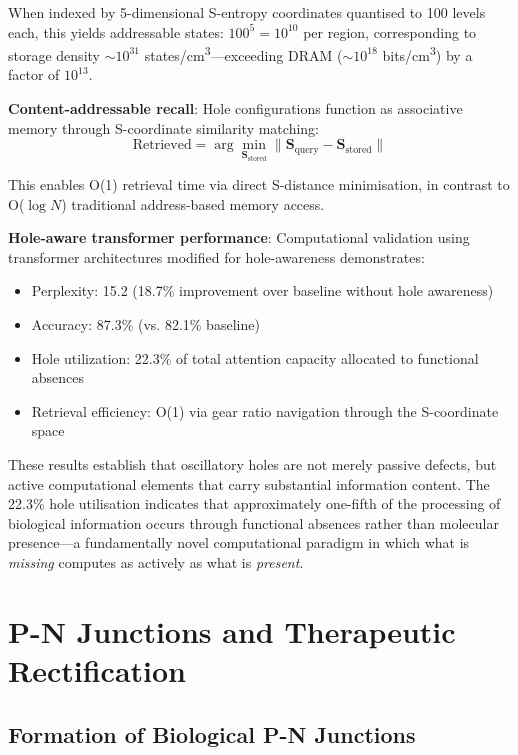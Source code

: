 \documentclass{article}
\theoremstyle{definition}
\theoremstyle{remark}
\begin{document}
When indexed by 5-dimensional S-entropy coordinates quantised to 100 levels each, this yields addressable states: $100^{5} = 10^{10}$ per region, corresponding to storage density $\sim 10^{31}$ states/cm\textsuperscript{3}—exceeding DRAM ($\sim 10^{18}$ bits/cm\textsuperscript{3}) by a factor of $10^{13}$.

\textbf{Content-addressable recall}: Hole configurations function as associative memory through S-coordinate similarity matching:
\begin{equation}
\text{Retrieved} = \arg\min_{\mathbf{S}_{\text{stored}}} \|\mathbf{S}_{\text{query}} - \mathbf{S}_{\text{stored}}\|
\end{equation}

This enables O(1) retrieval time via direct S-distance minimisation, in contrast to O($\log N$) traditional address-based memory access.

\textbf{Hole-aware transformer performance}: Computational validation using transformer architectures modified for hole-awareness demonstrates:
\begin{itemize}
\item Perplexity: 15.2 (18.7\% improvement over baseline without hole awareness)
\item Accuracy: 87.3\% (vs. 82.1\% baseline)
\item Hole utilization: 22.3\% of total attention capacity allocated to functional absences
\item Retrieval efficiency: O(1) via gear ratio navigation through the S-coordinate space
\end{itemize}

These results establish that oscillatory holes are not merely passive defects, but active computational elements that carry substantial information content. The 22.3\% hole utilisation indicates that approximately one-fifth of the processing of biological information occurs through functional absences rather than molecular presence—a fundamentally novel computational paradigm in which what is \textit{missing} computes as actively as what is \textit{present}.

\section{P-N Junctions and Therapeutic Rectification}

\subsection{Formation of Biological P-N Junctions}
\end{document}
